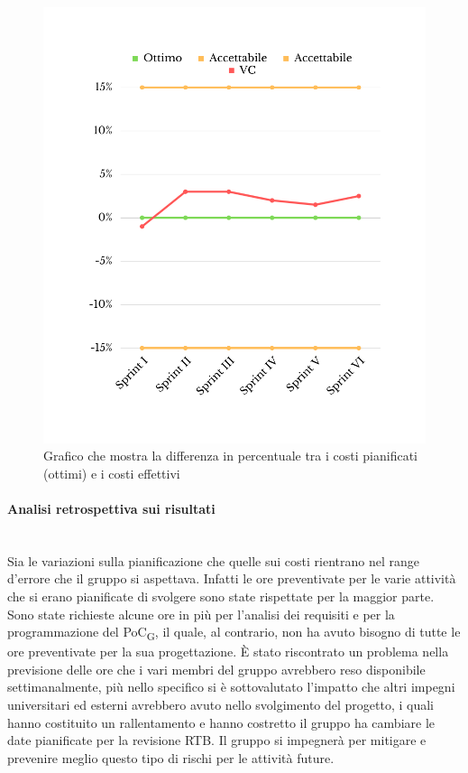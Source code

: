 \begin{figure}[H]
	\centering
	\includegraphics[scale=0.5]{img/CV.png}
	\caption{Grafico che mostra la differenza in percentuale tra i costi pianificati (ottimi) e i costi effettivi}
\end{figure}
\paragraph{Analisi retrospettiva sui risultati}\mbox{}\\
Sia le variazioni sulla pianificazione che quelle sui costi rientrano nel range d'errore che il gruppo si aspettava. Infatti le ore preventivate per le varie attività che si erano pianificate di svolgere sono state rispettate per la maggior parte. Sono state richieste alcune ore in più per l'analisi dei requisiti e per la programmazione del PoC\textsubscript{G}, il quale, al contrario, non ha avuto bisogno di tutte le ore preventivate per la sua progettazione. 
È stato riscontrato un problema nella previsione delle ore che i vari membri del gruppo avrebbero reso disponibile settimanalmente, più nello specifico si è sottovalutato l'impatto che altri impegni universitari ed esterni avrebbero avuto nello svolgimento del progetto, i quali hanno costituito un rallentamento e hanno costretto il gruppo ha cambiare le date pianificate per la revisione RTB. Il gruppo si impegnerà per mitigare e prevenire meglio questo tipo di rischi per le attività future.
